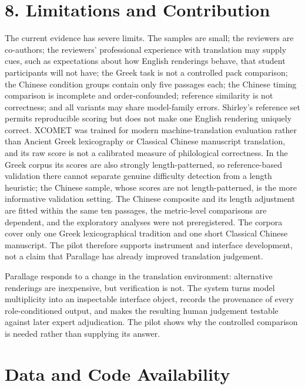 \documentclass[
  12pt,
]{article}
\begin{document}
\section{8. Limitations and
Contribution}\label{limitations-and-contribution}

The current evidence has severe limits. The samples are small; the
reviewers are co-authors; the reviewers' professional experience with
translation may supply cues, such as expectations about how English
renderings behave, that student participants will not have; the Greek
task is not a controlled pack
comparison; the Chinese condition groups contain only five passages
each; the Chinese timing comparison is incomplete and order-confounded;
reference similarity is not correctness; and all variants may share
model-family errors. Shirley's reference set permits reproducible
scoring but does not make one English rendering uniquely correct. XCOMET
was trained for modern machine-translation evaluation rather than
Ancient Greek lexicography or Classical Chinese manuscript translation,
and its raw score is not a calibrated measure of philological
correctness. In the Greek corpus its scores are also strongly
length-patterned, so reference-based validation there cannot separate
genuine difficulty detection from a length heuristic; the Chinese
sample, whose scores are not length-patterned, is the more informative
validation setting. The Chinese composite and its length adjustment are fitted
within the same ten passages, the metric-level comparisons are
dependent, and the exploratory analyses were not preregistered. The
corpora cover only one Greek lexicographical tradition and one short
Classical Chinese manuscript. The pilot therefore supports instrument
and interface development, not a claim that Parallage has already
improved translation judgement.

Parallage responds to a change in the translation environment:
alternative renderings are inexpensive, but verification is not. The
system turns model multiplicity into an inspectable interface object,
records the provenance of every role-conditioned output, and makes the
resulting human judgement testable against later expert adjudication.
The pilot shows why the controlled comparison is needed rather than
supplying its answer.

\section{Data and Code Availability}\label{data-and-code-availability}
\end{document}
